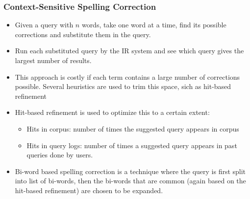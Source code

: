 \documentclass{article}
\begin{document}
\subsubsection{Context-Sensitive Spelling Correction}
\begin{itemize}
    \item Given a query with $n$ words, take one word at a time, find its possible corrections and substitute them in the query.
    
    \item Run each substituted query by the IR system and see which query gives the largest number of results. 
    
    \item This approach is costly if each term contains a large number of corrections possible. Several heuristics are used to trim this space, sich as hit-based refinement
    
    \item Hit-based refinement is used to optimize this to a certain extent:
    \begin{itemize}
        \item Hits in corpus: number of times the suggested query appears in corpus
        
        \item Hits in query logs: number of times a suggested query appears in past queries done by users. 
    \end{itemize}
    
    \item Bi-word based spelling correction is a technique where the query is first split into list of bi-words, then the bi-words that are common (again based on the hit-based refinement) are chosen to be expanded. 
\end{itemize}
\end{document}
